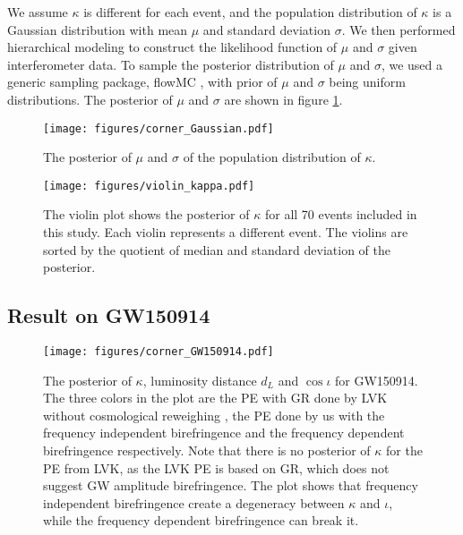 \documentclass[reprint,amsmath,amssymb,aps,twocolumn]{aastex631}
\begin{document}

We assume $\kappa$ is different for each event, and the population distribution of $\kappa$ is a Gaussian distribution with mean $\mu$ and standard deviation $\sigma$.
We then performed hierarchical modeling to construct the likelihood function of $\mu$ and $\sigma$ given interferometer data.
To sample the posterior distribution of $\mu$ and $\sigma$, we used a generic sampling package, flowMC \citep{flowMC}, with prior of $\mu$ and $\sigma$ being uniform distributions.
The posterior of $\mu$ and $\sigma$ are shown in figure \ref{fig:corner_Gaussian}.


\begin{figure}[h]
    \texttt{[image: figures/corner\_Gaussian.pdf]}
    \caption{
        The posterior of $\mu$ and $\sigma$ of the population distribution of $\kappa$.
    }
    \label{fig:corner_Gaussian}
\end{figure}



\begin{figure*}[ht]
    \texttt{[image: figures/violin\_kappa.pdf]}
    \caption{
        The violin plot shows the posterior of $\kappa$ for all 70 events included in this study.
        Each violin represents a different event.
        The violins are sorted by the quotient of median and standard deviation of the posterior.
    }
    \label{fig:violin_kappa}
\end{figure*}




\subsection{Result on GW150914}

\begin{figure}[h]
    \texttt{[image: figures/corner\_GW150914.pdf]}
    \caption{
        The posterior of $\kappa$, luminosity distance $d_L$ and $\cos{\iota}$ for GW150914.
        The three colors in the plot are the PE with GR done by LVK without cosmological reweighing \citep{GWTC-2.1, GWTC-3}, the PE done by us with the frequency independent birefringence and the frequency dependent birefringence respectively.
        Note that there is no posterior of $\kappa$ for the PE from LVK, as the LVK PE is based on GR, which does not suggest GW amplitude birefringence.
        The plot shows that frequency independent birefringence create a degeneracy between $\kappa$ and $\iota$, while the frequency dependent birefringence can break it.
    }
    \label{fig:corner_GW150914}
\end{figure}
\end{document}
